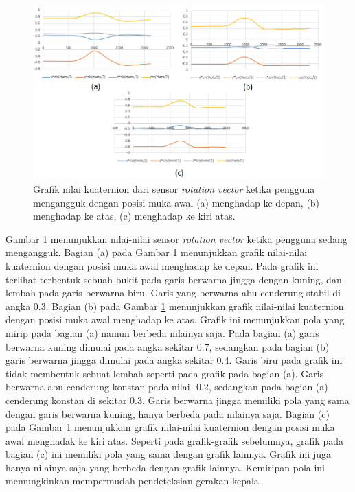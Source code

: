 \begin{figure}[htbp]
\centering
\includegraphics[scale=0.7]{Gambar/grafik-sensor-rot-vector-mengangguk.png}
\caption{Grafik nilai kuaternion dari sensor \textit{rotation vector} ketika pengguna mengangguk dengan posisi muka awal (a) menghadap ke depan, (b) menghadap ke atas, (c) menghadap ke kiri atas.} 
\label{fig:grafik-sensor-rot-vector-mengangguk}
\end{figure}

Gambar \ref{fig:grafik-sensor-rot-vector-mengangguk} menunjukkan nilai-nilai sensor \textit{rotation vector} ketika pengguna sedang mengangguk. Bagian (a) pada Gambar \ref{fig:grafik-sensor-rot-vector-mengangguk} menunjukkan grafik nilai-nilai kuaternion dengan posisi muka awal menghadap ke depan. Pada grafik ini terlihat terbentuk sebuah bukit pada garis berwarna jingga dengan kuning, dan lembah pada garis berwarna biru. Garis yang berwarna abu cenderung stabil di angka 0.3. Bagian (b) pada Gambar \ref{fig:grafik-sensor-rot-vector-mengangguk} menunjukkan grafik nilai-nilai kuaternion dengan posisi muka awal menghadap ke atas. Grafik ini menunjukkan pola yang mirip pada bagian (a) namun berbeda nilainya saja. Pada bagian (a) garis berwarna kuning dimulai pada angka sekitar 0.7, sedangkan pada bagian (b) garis berwarna jingga dimulai pada angka sekitar 0.4. Garis biru pada grafik ini tidak membentuk sebuat lembah seperti  pada grafik pada bagian (a). Garis berwarna abu cenderung konstan pada nilai -0.2, sedangkan pada bagian (a) cenderung konstan di sekitar 0.3. Garis berwarna jingga memiliki pola yang sama dengan garis berwarna kuning, hanya berbeda pada nilainya saja. Bagian (c) pada Gambar \ref{fig:grafik-sensor-rot-vector-mengangguk} menunjukkan grafik nilai-nilai kuaternion dengan posisi muka awal menghadak ke kiri atas. Seperti pada grafik-grafik sebelumnya, grafik pada bagian (c) ini memiliki pola yang sama dengan grafik lainnya. Grafik ini juga hanya nilainya saja yang berbeda dengan grafik lainnya. Kemiripan pola ini memungkinkan mempermudah pendeteksian gerakan kepala. 

